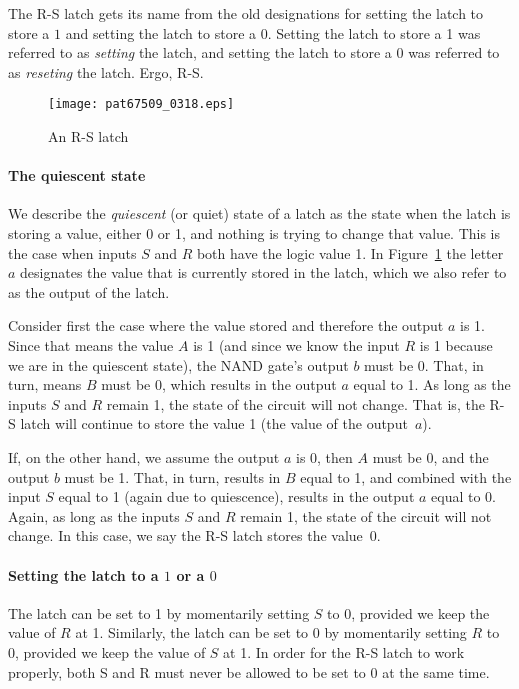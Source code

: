 \documentclass{patt}
\begin{document}
The R-S latch gets its name from the old designations for setting the latch to
store a $1$ and setting the latch to store a $0$.  Setting the latch to store 
a 1 was referred to as {\em setting} the latch, and setting the latch to store 
a 0 was referred to as {\em reseting} the latch.  Ergo, R-S.

\begin{figure}[h]
\centerline{\texttt{[image: pat67509\_0318.eps]}}
\caption{An R-S latch}
\label{fig:rslatch}
\end{figure}

\paragraph{The quiescent state}

We describe the {\em quiescent} (or quiet) state of a latch as the state
when the latch is storing a value, either 0 or 1, and nothing is trying to
change that value.  This is the case when inputs $S$ and $R$ both have the 
logic value 1.  In Figure~\ref{fig:rslatch} the letter $a$ designates the 
value that is currently stored in the latch, which we also refer to as the
output of the latch. 

Consider first the case where the value stored and therefore the output $a$ 
is 1.  Since that means the value $A$ is 1 (and since we know the input $R$
is 1 because we are in the quiescent state), the NAND gate's output $b$ 
must be 0.  That, in turn, means $B$ must be 0, which results in the
output $a$ equal to 1.  As long as the inputs $S$ and $R$ remain 1,
the state of the circuit will not change.  That is, the R-S latch will
continue to store the value 1 (the value of the output~$a$).

If, on the other hand, we assume the output $a$ is 0, then
$A$ must be 0, and the output $b$ must be 1.  That, in turn, results
in $B$ equal to 1, and combined with the input $S$ equal to
1 (again due to quiescence), results in the output $a$ equal to 0.
Again, as long as the inputs $S$ and $R$ remain 1, the state of the
circuit will not change.  In this case, we say the R-S latch stores
the value~0.

\paragraph{Setting the latch to a $1$ or a $0$}

The latch can be set to 1 by momentarily setting $S$ to 0, provided we
\lightbulb[-18pt]
keep the value of $R$ at 1.  Similarly, the latch can be set to 0 by
momentarily setting $R$ to 0, provided we keep the value of $S$ at 1.
In order for the R-S latch to work properly, both S and R must never be
allowed to be set to 0 at the same time.
\end{document}
